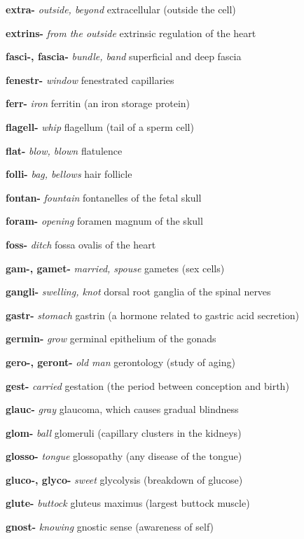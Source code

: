 \documentclass[10pt]{article}
\begin{document}
\begin{multicols}{2}
\begin{hangparas}{10pt}{1}
 \textbf{extra-} \textit{outside, beyond} extracellular (outside the cell) \par
 \textbf{extrins-} \textit{from the outside} extrinsic regulation of the heart \par
 \textbf{fasci-, fascia-} \textit{bundle, band} superficial and deep fascia \par
 \textbf{fenestr-} \textit{window} fenestrated capillaries \par
 \textbf{ferr-} \textit{iron} ferritin (an iron storage protein) \par
 \textbf{flagell-} \textit{whip} flagellum (tail of a sperm cell) \par
 \textbf{flat-} \textit{blow, blown} flatulence \par
 \textbf{folli-} \textit{bag, bellows} hair follicle \par
 \textbf{fontan-} \textit{fountain} fontanelles of the fetal skull \par
 \textbf{foram-} \textit{opening} foramen magnum of the skull \par
 \textbf{foss-} \textit{ditch} fossa ovalis of the heart \par
 \textbf{gam-, gamet-} \textit{married, spouse} gametes (sex cells) \par
 \textbf{gangli-} \textit{swelling, knot} dorsal root ganglia of the spinal nerves \par
 \textbf{gastr-} \textit{stomach} gastrin (a hormone related to gastric acid secretion) \par
 \textbf{germin-} \textit{grow} germinal epithelium of the gonads \par
 \textbf{gero-, geront-} \textit{old man} gerontology (study of aging) \par
 \textbf{gest-} \textit{carried} gestation (the period between conception and birth) \par
 \textbf{glauc-} \textit{gray} glaucoma, which causes gradual blindness \par
 \textbf{glom-} \textit{ball} glomeruli (capillary clusters in the kidneys) \par
 \textbf{glosso-} \textit{tongue} glossopathy (any disease of the tongue) \par
 \textbf{gluco-, glyco-} \textit{sweet} glycolysis (breakdown of glucose) \par
 \textbf{glute-} \textit{buttock} gluteus maximus (largest buttock muscle) \par
 \textbf{gnost-} \textit{knowing} gnostic sense (awareness of self) \par

\end{hangparas}
\end{multicols}
\end{document}
